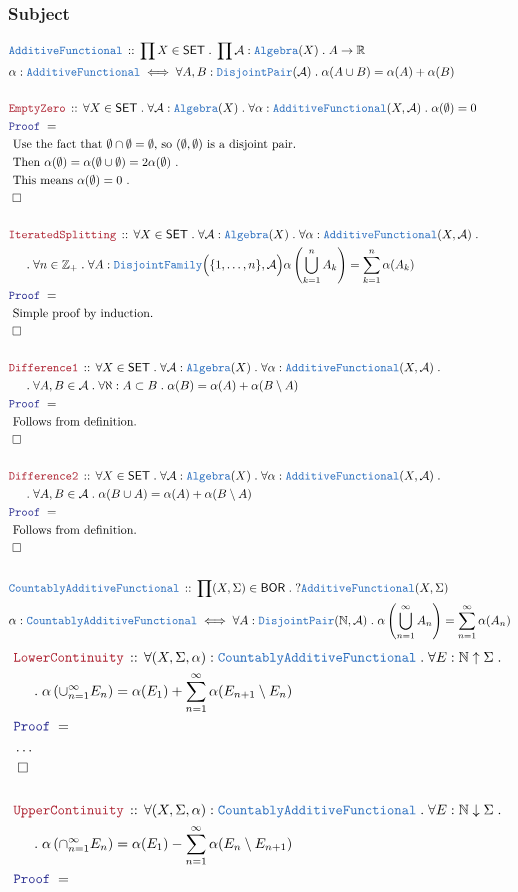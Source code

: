 \documentclass[12pt]{scrartcl}
\newcommand{\TYPE}[1]{\textcolor{NavyBlue}{\mathtt{#1}}}
\newcommand{\LOGIC}[1]{\textcolor{Blue}{\mathtt{#1}}}
\newcommand{\THM}[1]{\textcolor{Maroon}{\mathtt{#1}}}
\renewcommand{\.}{\; . \;}
\newcommand{\Theorem}[2]{& \THM{#1} \, :: \, #2 \\ & \Proof = \\ }
\newcommand{\DeclareType}[2]{& \TYPE{#1} \, :: \, #2 \\}
\newcommand{\DefineType}[3]{& #1 : \TYPE{#2} \iff #3 \\}
\newcommand{\NewLine}{\\ & \kern 1pc}
\newcommand{\Page}[1]{ \begin{align*} #1 \end{align*}   }
\newcommand{\NoProof}{ & \ldots \\ \EndProof}
\newcommand{\Int}{\mathbb{Z} }
\newcommand{\Reals}{\mathbb{R} }
\newcommand{\Nat}{\mathbb{N} }
\newcommand{\QED}{\; \square}
\newcommand{\EndProof}{& \QED \\}
\newcommand{\Proof}{\LOGIC{Proof} \; }
\newcommand{\Explain}[1]{& \text{#1.} \\}
\newcommand{\A}{\mathcal{A}}
\newcommand{\SET}{\mathsf{SET}}
\newcommand{\Alg}{\TYPE{Algebra}}
\newcommand{\BOR}{\mathsf{BOR}}
\newcommand{\AF}{\TYPE{AdditiveFunctional}}
\newcommand{\CAF}{\TYPE{CountablyAdditiveFunctional}}
\begin{document}
\subsubsection{Subject}
\Page{
	\DeclareType{\AF}{\prod X \in \SET \. \prod \A : \Alg(X) \. A \to \Reals}
	\DefineType{\alpha}{\AF}{\forall A,B : \TYPE{DisjointPair}(\A) \. \alpha(A \cup B) = \alpha(A) + \alpha(B)  }
	\\
	\Theorem{EmptyZero}
	{
		\forall X \in \SET \.
		\forall \A : \Alg(X) \.
		\forall \alpha : \AF(X,\A) \.
		\alpha(\emptyset) = 0
	}
	\Explain{ 
		Use the fact that $\emptyset \cap \emptyset = \emptyset$, so $(\emptyset,\emptyset)$ 
		is a disjoint  pair}
	\Explain{
		Then $\alpha(\emptyset) = \alpha(\emptyset \cup \emptyset) = 2\alpha(\emptyset)$	
	}
	\Explain{
		This means $\alpha(\emptyset) = 0$
	}
	\EndProof
	\\
	\Theorem{IteratedSplitting}
	{
		\forall X \in \SET \.
		\forall \A : \Alg(X) \.
		\forall \alpha : \AF(X,\A) \. \NewLine \.
		\forall n \in \Int_+ \.
		\forall A : \TYPE{DisjointFamily}\Big(\{1,\ldots,n\},\A\Big)
		\alpha\left(\bigcup^n_{k=1} A_k \right) = \sum^n_{k=1} \alpha(A_k)
	}
	\Explain{ Simple proof by induction}
	\EndProof
	\\
	\Theorem{Difference1}
	{
		\forall X \in \SET \.
		\forall \A : \Alg(X) \.
		\forall \alpha : \AF(X,\A) \. \NewLine \.
		\forall A,B \in \A \.
		\forall \aleph : A \subset B \.
		\alpha(B) = \alpha(A) + \alpha(B \setminus A)
	}
	\Explain{ Follows from definition}
	\EndProof
	\\
	\Theorem{Difference2}
	{
		\forall X \in \SET \.
		\forall \A : \Alg(X) \.
		\forall \alpha : \AF(X,\A) \. \NewLine \.
		\forall A,B \in \A \.
		\alpha(B \cup A) = \alpha(A) + \alpha(B \setminus A)
	}
	\Explain{ Follows from definition}
	\EndProof
	\\
	\DeclareType{\CAF}{\prod (X,\Sigma) \in \BOR \. ?\AF(X,\Sigma)}
	\DefineType{\alpha}{\CAF}{
		\forall A : \TYPE{DisjointPair}(\Nat, \A) \.
		\alpha\left( \bigcup^\infty_{n=1} A_n \right) = \sum^\infty_{n=1} \alpha(A_n)
	}
}\Page{
	\Theorem{LowerContinuity}
	{
		\forall  (X,\Sigma,\alpha) : \CAF \.
		\forall E : \Nat \uparrow \Sigma \. \NewLine \.
		\alpha\left( \cup^\infty_{n=1} E_n \right) = 
		\alpha(E_1) + \sum^\infty_{n=1} \alpha (E_{n+1} \setminus E_n) 
	}
	\NoProof
	\\
	\Theorem{UpperContinuity}
	{
		\forall  (X,\Sigma,\alpha) : \CAF \.
		\forall E : \Nat \downarrow \Sigma \. \NewLine \.
		\alpha\left( \cap^\infty_{n=1} E_n \right) = 
		\alpha(E_1) - \sum^\infty_{n=1} \alpha (E_{n} \setminus E_{n+1}) 
}}
\end{document}
